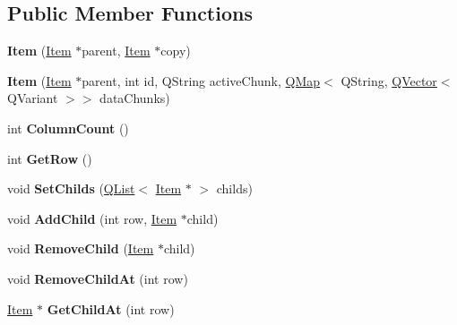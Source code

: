 \subsection*{Public Member Functions}
\begin{DoxyCompactItemize}
\item 
{\bfseries Item} (\hyperlink{class_item}{Item} $\ast$parent, \hyperlink{class_item}{Item} $\ast$copy)\hypertarget{class_item_aef96722ef425ab3794691db85ba4abd6}{}\label{class_item_aef96722ef425ab3794691db85ba4abd6}

\item 
{\bfseries Item} (\hyperlink{class_item}{Item} $\ast$parent, int id, Q\+String active\+Chunk, \hyperlink{class_q_map}{Q\+Map}$<$ Q\+String, \hyperlink{class_q_vector}{Q\+Vector}$<$ Q\+Variant $>$$>$ data\+Chunks)\hypertarget{class_item_a27fb96423d6e35b384b226bc3408b348}{}\label{class_item_a27fb96423d6e35b384b226bc3408b348}

\item 
int {\bfseries Column\+Count} ()\hypertarget{class_item_ae09610bc79b15b17cce0428661b14a88}{}\label{class_item_ae09610bc79b15b17cce0428661b14a88}

\item 
int {\bfseries Get\+Row} ()\hypertarget{class_item_adad3b372e59e9b033d3f8dc371fac651}{}\label{class_item_adad3b372e59e9b033d3f8dc371fac651}

\item 
void {\bfseries Set\+Childs} (\hyperlink{class_q_list}{Q\+List}$<$ \hyperlink{class_item}{Item} $\ast$ $>$ childs)\hypertarget{class_item_a10447a235cd6db703b59ed7b33ad7607}{}\label{class_item_a10447a235cd6db703b59ed7b33ad7607}

\item 
void {\bfseries Add\+Child} (int row, \hyperlink{class_item}{Item} $\ast$child)\hypertarget{class_item_a6a98cb08e94548f37614132f663f5dfb}{}\label{class_item_a6a98cb08e94548f37614132f663f5dfb}

\item 
void {\bfseries Remove\+Child} (\hyperlink{class_item}{Item} $\ast$child)\hypertarget{class_item_ab77ee89c1d573571d46276904ddea022}{}\label{class_item_ab77ee89c1d573571d46276904ddea022}

\item 
void {\bfseries Remove\+Child\+At} (int row)\hypertarget{class_item_a88f43c96e836f5a1473763fd0e8846bb}{}\label{class_item_a88f43c96e836f5a1473763fd0e8846bb}

\item 
\hyperlink{class_item}{Item} $\ast$ {\bfseries Get\+Child\+At} (int row)\hypertarget{class_item_a80ac5f26c6d125de147b2c5aae8631c7}{}\label{class_item_a80ac5f26c6d125de147b2c5aae8631c7}


\end{DoxyCompactItemize}
